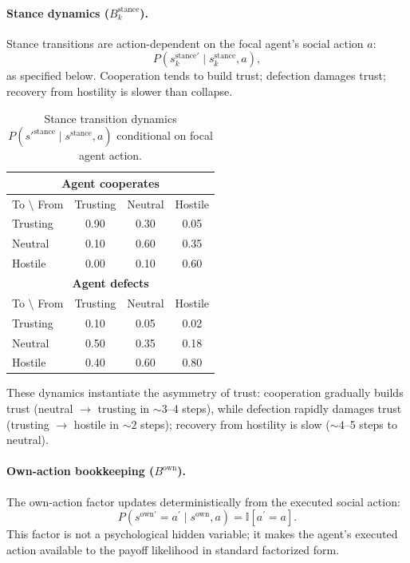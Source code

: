 \paragraph{Stance dynamics ($B_k^{\mathrm{stance}}$).}
Stance transitions are action-dependent on the focal agent's social action $a$:
\begin{equation}
P\!\left(s_k^{\mathrm{stance}\prime}\mid s_k^{\mathrm{stance}}, a\right),
\label{eq:b_stance}
\end{equation}
as specified below. Cooperation tends to build trust; defection damages trust; recovery from hostility is slower than collapse.

\begin{table}[H]
\centering
\caption{Stance transition dynamics $P(s'^{\text{stance}} \mid s^{\text{stance}}, a)$ conditional on focal agent action.}
\label{tab:b_stance}
\begin{tabular}{lccc}
\toprule
\multicolumn{4}{c}{\textbf{Agent cooperates}} \\
\midrule
To $\setminus$ From & Trusting & Neutral & Hostile \\
\midrule
Trusting & 0.90 & 0.30 & 0.05 \\
Neutral & 0.10 & 0.60 & 0.35 \\
Hostile & 0.00 & 0.10 & 0.60 \\
\midrule
\multicolumn{4}{c}{\textbf{Agent defects}} \\
\midrule
To $\setminus$ From & Trusting & Neutral & Hostile \\
\midrule
Trusting & 0.10 & 0.05 & 0.02 \\
Neutral & 0.50 & 0.35 & 0.18 \\
Hostile & 0.40 & 0.60 & 0.80 \\
\bottomrule
\end{tabular}
\end{table}

These dynamics instantiate the asymmetry of trust: cooperation gradually builds trust (neutral $\to$ trusting in $\sim 3$--4 steps), while defection rapidly damages trust (trusting $\to$ hostile in $\sim 2$ steps); recovery from hostility is slow ($\sim 4$--5 steps to neutral).

\paragraph{Own-action bookkeeping ($B^{\mathrm{own}}$).}
The own-action factor updates deterministically from the executed social action:
\begin{equation}
P(s^{\mathrm{own}\prime}=a^\prime \mid s^{\mathrm{own}}, a)=\mathbb{I}[a^\prime=a].
\label{eq:b_own}
\end{equation}
This factor is not a psychological hidden variable; it makes the agent's executed action available to the payoff likelihood in standard factorized form.

